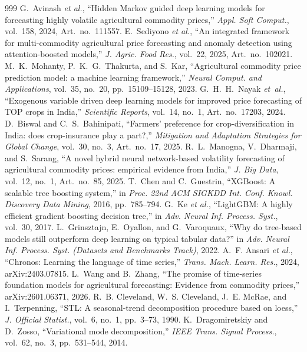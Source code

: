 \begin{thebibliography}{999}
 G.~Avinash \emph{et al.}, ``Hidden Markov guided deep learning models for forecasting highly volatile agricultural commodity prices,'' \emph{Appl. Soft Comput.}, vol.~158, 2024, Art.\ no.~111557.
 E.~Sediyono \emph{et al.}, ``An integrated framework for multi-commodity agricultural price forecasting and anomaly detection using attention-boosted models,'' \emph{J. Agric. Food Res.}, vol.~22, 2025, Art.\ no.~102021.
 M.~K.~Mohanty, P.~K.~G.~Thakurta, and S.~Kar, ``Agricultural commodity price prediction model: a machine learning framework,'' \emph{Neural Comput. and Applications}, vol.~35, no.~20, pp.~15109--15128, 2023.
 G.~H.~H.~Nayak \emph{et~al.}, ``Exogenous variable driven deep learning models for improved price forecasting of TOP crops in India,'' \emph{Scientific Reports}, vol.~14, no.~1, Art.\ no.~17203, 2024.
 D.~Biswal and C.~S.~Bahinipati, ``Farmers' preference for crop-diversification in India: does crop-insurance play a part?,'' \emph{Mitigation and Adaptation Strategies for Global Change}, vol.~30, no.~3, Art.\ no.~17, 2025.
 R.~L.~Manogna, V.~Dharmaji, and S.~Sarang, ``A novel hybrid neural network-based volatility forecasting of agricultural commodity prices: empirical evidence from India,'' \emph{J. Big Data}, vol.~12, no.~1, Art.\ no.~85, 2025.
 T.~Chen and C.~Guestrin, ``XGBoost: A scalable tree boosting system,'' in \emph{Proc. 22nd ACM SIGKDD Int. Conf. Knowl. Discovery Data Mining}, 2016, pp.~785--794.
 G.~Ke \emph{et al.}, ``LightGBM: A highly efficient gradient boosting decision tree,'' in \emph{Adv. Neural Inf. Process. Syst.}, vol.~30, 2017.
 L.~Grinsztajn, E.~Oyallon, and G.~Varoquaux, ``Why do tree-based models still outperform deep learning on typical tabular data?'' in \emph{Adv. Neural Inf. Process. Syst. (Datasets and Benchmarks Track)}, 2022.
 A.~F. Ansari \emph{et al.}, ``Chronos: Learning the language of time series,'' \emph{Trans. Mach. Learn. Res.}, 2024, arXiv:2403.07815.
 L.~Wang and B.~Zhang, ``The promise of time-series foundation models for agricultural forecasting: Evidence from commodity prices,'' arXiv:2601.06371, 2026.
 R.~B. Cleveland, W.~S. Cleveland, J.~E. McRae, and I.~Terpenning, ``STL: A seasonal-trend decomposition procedure based on loess,'' \emph{J. Official Statist.}, vol.~6, no.~1, pp.~3--73, 1990.
 K.~Dragomiretskiy and D.~Zosso, ``Variational mode decomposition,'' \emph{IEEE Trans. Signal Process.}, vol.~62, no.~3, pp.~531--544, 2014.

\end{thebibliography}
